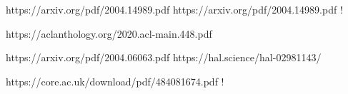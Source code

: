 https://arxiv.org/pdf/2004.14989.pdf
https://arxiv.org/pdf/2004.14989.pdf !


https://aclanthology.org/2020.acl-main.448.pdf


https://arxiv.org/pdf/2004.06063.pdf
https://hal.science/hal-02981143/


https://core.ac.uk/download/pdf/484081674.pdf !